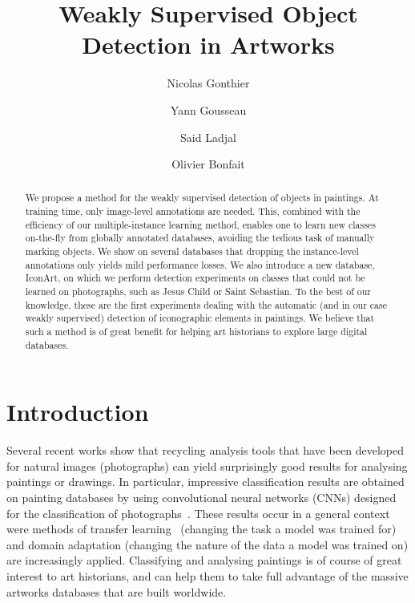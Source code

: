 \documentclass[runningheads]{llncs}
\begin{document}
\title{Weakly Supervised Object Detection in Artworks} 


\author{Nicolas Gonthier \and
Yann Gousseau \and
Said Ladjal \and
Olivier Bonfait}




\maketitle              

\begin{abstract}
We propose a method for the weakly supervised detection of objects in paintings. At training time, only image-level annotations are needed. This, combined with the efficiency of our multiple-instance learning method, enables one to learn new classes on-the-fly from globally annotated databases, avoiding the tedious task of manually marking objects. We show on several databases that dropping the instance-level annotations only yields mild performance losses. We also introduce a new database, IconArt, on which we perform detection experiments on classes that could not be learned on photographs, such as Jesus Child or Saint Sebastian. To the best of our knowledge, these are the first experiments dealing with the automatic (and in our case weakly supervised) detection of iconographic elements in paintings. We believe that such a method is of great benefit for helping art historians to explore large digital databases. 
\end{abstract}


\section{Introduction}
Several recent works show that recycling analysis tools that have been developed for natural images (photographs) can yield surprisingly good results for analysing paintings or drawings. In particular, impressive classification results are obtained on painting databases by using convolutional neural networks (CNNs) designed for the classification of photographs~\cite{crowley_search_2014,yin2016object}. These results occur in a general context were methods of transfer learning~\cite{donahue_decaf_2013} (changing the task a model was trained for) and domain adaptation (changing the nature of the data a model was trained on) are increasingly applied. Classifying and analysing paintings is of course of great interest to art historians, and can help them to take full advantage of the massive artworks databases that are built worldwide. 
\end{document}
